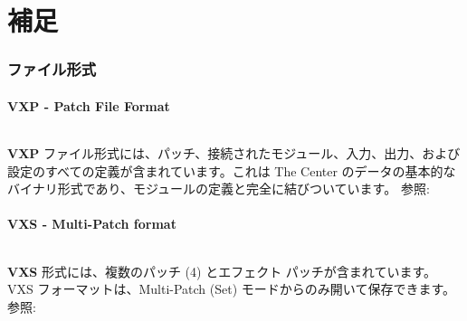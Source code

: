 \documentclass[table]{article}
\begin{document}
\ifdefined\USERMANUAL%
  \newpage
  \part{補足}
  \newpage
  \section{ファイル形式}\label{section:fileformats}
  \subsection{VXP - Patch File Format}
  \paragraph*{}%
  \textbf{VXP} ファイル形式には、パッチ、接続されたモジュール、入力、出力、および設定のすべての定義が含まれています。これは The Center のデータの基本的なバイナリ形式であり、モジュールの定義と完全に結びついています。 参照: \underline{}
  \subsection{VXS - Multi-Patch format}
  \paragraph*{}%
  \textbf{VXS} 形式には、複数のパッチ (4) とエフェクト パッチが含まれています。 VXS フォーマットは、Multi-Patch (Set) モードからのみ開いて保存できます。 参照: \underline{}

\else
\fi
\end{document}
